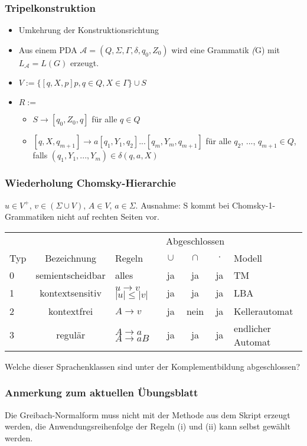\documentclass{beamer}
\begin{document}
\begin{frame}
 \frametitle{Tripelkonstruktion}
 \begin{itemize}
  \item Umkehrung der Konstruktionsrichtung
  \item Aus einem PDA $\mathcal{A} = (Q, \Sigma, \Gamma, \delta, q_0, Z_0)$ wird eine Grammatik \textit(G) mit $L_{\mathcal{A}} = L(G)$ erzeugt.
 \end{itemize} 
 \begin{itemize}
  \item $V := \{[q, X, p]p, q \in Q, X \in \Gamma \} \cup S$
  \item $R := $
  \begin{itemize}
   \item $S \rightarrow [q_0, Z_0, q]$ für alle $q \in Q$
   \item $[q, X, q_{m+1}] \rightarrow a[q_1, Y_1, q_2] ... [q_m, Y_m, q_{m+1}]$ für alle $q_2$, ..., $q_{m+1} \in Q$,
   falls $(q_1, Y_1, ..., Y_m) \in \delta(q, a, X)$
  \end{itemize}
 \end{itemize}

\end{frame}


\begin{frame}
 \frametitle{Wiederholung Chomsky-Hierarchie}
 $u \in V^+$, $v \in (\Sigma \cup V)$, $A \in V$, $a \in \Sigma$.
  Ausnahme: S kommt bei Chomsky-1-Grammatiken nicht auf rechten Seiten vor.
 \begin{table}
 \begin{center}
 \begin{tabular}{| l | c | p{1.4cm} | c | c | c | l |}
 \hline
 & & & \multicolumn{3}{|c|}{Abgeschlossen} &\\
 Typ & Bezeichnung & Regeln & $\cup$ & $\cap$ & $\cdot$ & Modell\\ \hline
 0 & semientscheidbar & alles & ja & ja & ja & TM \\ \hline
 1 & kontextsensitiv & $u \rightarrow v$ $|u| \leq |v|$ & ja & ja & ja &  LBA \\ \hline
 2 & kontextfrei & $A \rightarrow v$ & ja & nein & ja & Kellerautomat \\ \hline
 3 & regulär & $A \rightarrow a$  $A \rightarrow aB$ & ja & ja & ja & endlicher Automat \\ \hline
 \end{tabular}
 \end{center}
 \end{table}
\pause
Welche dieser Sprachenklassen sind unter der Komplementbildung abgeschlossen?
\end{frame}

\begin{frame}
 \frametitle{Anmerkung zum aktuellen Übungsblatt}
 Die Greibach-Normalform muss nicht mit der Methode aus dem Skript erzeugt werden,
 die Anwendungsreihenfolge der Regeln (i) und (ii) kann selbst gewählt werden.
\end{frame}


\end{document}
